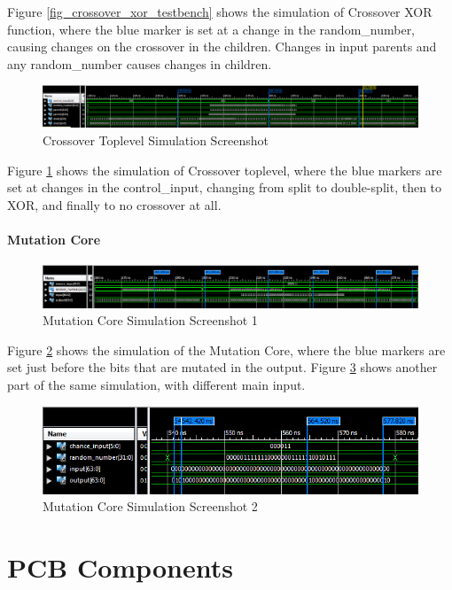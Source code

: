 Figure \ref{fig_crossover_xor_testbench} shows the simulation of Crossover XOR function, where the blue marker is set at a change in the random\_number, causing changes on the crossover in the children.
Changes in input parents and any random\_number causes changes in children. 

\begin{figure}[H]
\includegraphics[width=\textwidth]{fpga/fig/testbenches/crossover_toplevel_testbench.png}
\caption{Crossover Toplevel Simulation Screenshot}
\label{fig_crossover_toplevel_testbench}
\end{figure}

Figure \ref{fig_crossover_toplevel_testbench} shows the simulation of Crossover toplevel, where the blue markers are set at changes in the control\_input, changing from split to double-split, then to XOR, and finally to no crossover at all.

\subsubsection{Mutation Core}
\begin{figure}[H]
\includegraphics[width=\textwidth]{fpga/fig/testbenches/mutation_simulation1.png}
\caption{Mutation Core Simulation Screenshot 1}
\label{fig_mutation_testbench1}
\end{figure}

Figure \ref{fig_mutation_testbench1} shows the simulation of the Mutation Core, where the blue markers are set just before the bits that are mutated in the output.
Figure \ref{fig_mutation_testbench2} shows another part of the same simulation, with different main input.

\begin{figure}[H]
\includegraphics[width=\textwidth]{fpga/fig/testbenches/mutation_simulation2.png}
\caption{Mutation Core Simulation Screenshot 2}
\label{fig_mutation_testbench2}
\end{figure}


\chapter{PCB Components} \label{appendix:components}

\newpage
